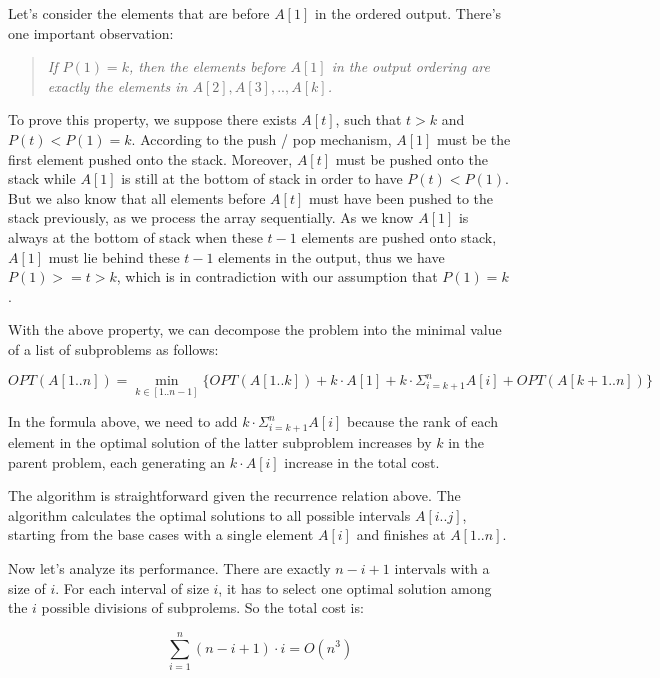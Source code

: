 Let's consider the elements that are before $A[1]$ in the ordered output. There's one important observation:

\begin{quote}
  \textit{If $P(1) = k$, then the elements before $A[1]$ in the output ordering are exactly the elements in $A[2], A[3], .., A[k]$.}
\end{quote}

To prove this property, we suppose there exists $A[t]$, such that $t > k$ and $P(t) < P(1) = k$. According to the push / pop mechanism, $A[1]$ must be the first element pushed onto the stack. Moreover, $A[t]$ must be pushed onto the stack while $A[1]$ is still at the bottom of stack in order to have $P(t) < P(1)$. But we also know that all elements before $A[t]$ must have been pushed to the stack previously, as we process the array sequentially. As we know $A[1]$ is always at the bottom of stack when these $t - 1$ elements are pushed onto stack, $A[1]$ must lie behind these $t - 1$ elements in the output, thus we have $P(1) >= t > k$, which is in contradiction with our assumption that $P(1) = k$.

With the above property, we can decompose the problem into the minimal value of a list of subproblems as follows:

\[
OPT(A[1..n]) = \min_{k \in [1..n-1]} \{ OPT(A[1..k]) + k \cdot A[1] + k \cdot \Sigma_{i = k + 1}^{n}A[i] + OPT(A[k+1..n]) \}
\]

In the formula above, we need to add $k \cdot \Sigma_{i = k + 1}^{n}A[i]$ because the rank of each element in the optimal solution of the latter subproblem increases by $k$ in the parent problem, each generating an $k\cdot A[i]$ increase in the total cost.

The algorithm is straightforward given the recurrence relation above. The algorithm calculates the optimal solutions to all possible intervals $A[i..j]$, starting from the base cases with a single element $A[i]$ and finishes at $A[1..n]$.

Now let's analyze its performance. There are exactly $n - i + 1$ intervals with a size of $i$. For each interval of size $i$, it has to select one optimal solution among the $i$ possible divisions of subprolems. So the total cost is:

\[
   \sum_{i=1}^{n} (n - i + 1) \cdot i = O(n^3)
\]
